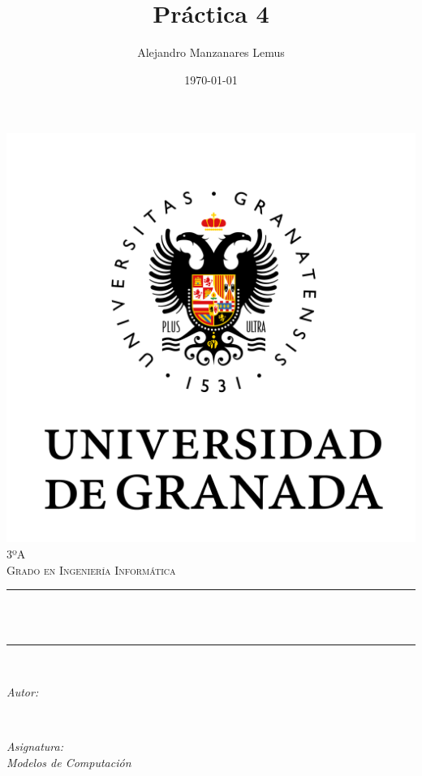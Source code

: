 \documentclass[12pt, spanish]{article}
\title{Práctica 4}
\author{Alejandro Manzanares Lemus }
\date{\today}
\makeatletter
\let\thetitle\@title
\let\theauthor\@author
\let\thedate\@date
\makeatother
\begin{document}
\begin{titlepage}
    \centering
    \vspace*{0.5 cm}
    \includegraphics[scale = 0.50]{UGR.png}\\[1.0 cm]
    \textsc{\large 3ºA}\\[0.5 cm]            
    \textsc{\large Grado en Ingeniería Informática}\\[0.5 cm]              
    \rule{\linewidth}{0.2 mm} \\[0.4 cm]
    { \huge \bfseries \thetitle}\\
    \rule{\linewidth}{0.2 mm} \\[1.5 cm]
    
    \begin{minipage}{0.4\textwidth}
        \begin{flushleft} \large
            \emph{Autor:}\\
            \theauthor
            \end{flushleft}
            \end{minipage}~
            \begin{minipage}{0.4\textwidth}
            \begin{flushright} \large
            \emph{Asignatura: \\
            Modelos de Computación}                   
        \end{flushright}
    \end{minipage}\\[1 cm]
  	
    {\large \thedate}\\[1 cm]
 	
    \vfill
    
\end{titlepage}
\pagebreak
\end{document}
